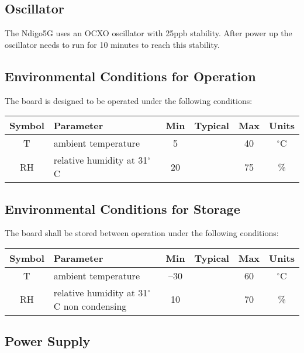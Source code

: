 	\subsection{Oscillator}
		
		The Ndigo5G uses an OCXO oscillator with 25ppb stability. After power up the oscillator needs to run for 10 minutes to reach this stability.
		
	\subsection{Environmental Conditions for Operation}
		\label{enviro_op}
		The board is designed to be operated under the following conditions:
		
		\noindent
		\begin{tabularx}{\textwidth}{|c|X|c|c|c|c|}
			\hline
			Symbol & Parameter & Min & Typical & Max & Units\\
			\hline\hline
			T & ambient temperature & 5 && 40 & $^{\circ}$C\\
			\hline
			RH & relative humidity at 31$^{\circ}$C & 20 && 75 & \%\\
			\hline
		\end{tabularx}
		
	\subsection{Environmental Conditions for Storage}
		\label{enviro_store}
		The board shall be stored between operation under the following conditions:
		
		\noindent
		\begin{tabularx}{\textwidth}{|c|X|c|c|c|c|}
			\hline
			Symbol & Parameter & Min & Typical & Max & Units\\
			\hline\hline
			T & ambient temperature & --30 && 60 & $^{\circ}$C\\
			\hline
			RH & relative humidity at 31$^{\circ}$C non condensing & 10 && 70 & \%\\
			\hline
		\end{tabularx}
		
	\subsection{Power Supply}
		
